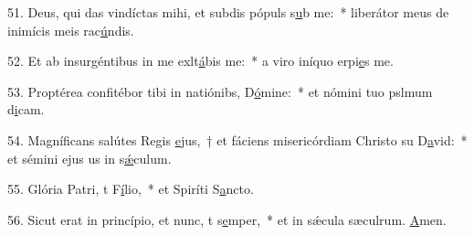 51. Deus, qui das vindíctas mihi, et subdis pópuls s\uline{u}b me:~* liberátor meus de inimícis meis rac\uline{ú}ndis.\par 
52. Et ab insurgéntibus in me exlt\uline{á}bis me:~* a viro iníquo erpi\uline{e}s me.\par 
53. Proptérea confitébor tibi in natiónibs, D\uline{ó}mine:~* et nómini tuo pslmum d\uline{i}cam.\par 
54. Magníficans salútes Regis \uline{e}jus,~† et fáciens misericórdiam Christo su D\uline{a}vid:~* et sémini ejus us in s\uline{ǽ}culum.\par 
55. Glória Patri, t F\uline{í}lio,~* et Spiríti S\uline{a}ncto.\par 
56. Sicut erat in princípio, et nunc, t s\uline{e}mper,~* et in sǽcula sæculrum. \uline{A}men.\par 
